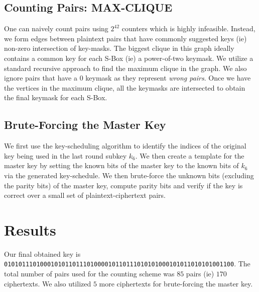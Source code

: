 \documentclass[12pt]{article}
\begin{document}
\subsection{Counting Pairs: MAX-CLIQUE}
One can naively count pairs using $2^{42}$ counters which is highly infeasible. Instead, we form edges between plaintext pairs that have commonly suggested keys (ie) non-zero intersection of key-masks. The biggest clique in this graph ideally contains a common key for each S-Box (ie) a power-of-two keymask. We utilize a standard recursive approach to find the maximum clique in the graph. We also ignore pairs that have a $0$ keymask as they represent \emph{wrong pairs}. Once we have the vertices in the maximum clique, all the keymasks are intersected to obtain the final keymask for each S-Box.

\subsection{Brute-Forcing the Master Key}
We first use the key-scheduling algorithm to identify the indices of the original key being used in the last round subkey $k_6$. We then create a template for the master key by setting the known bits of the master key to the known bits of $k_6$ via the generated key-schedule. We then brute-force the unknown bits (excluding the parity bits) of the master key, compute parity bits and verify if the key is correct over a small set of plaintext-ciphertext pairs.

\section{Results}
Our final obtained key is \texttt{0101011101000101011011101000010110111010101000101011010101001100}. The total number of pairs used for the counting scheme was $85$ pairs (ie) $170$ ciphertexts. We also utilized $5$ more ciphertexts for brute-forcing the master key.



\end{document}
